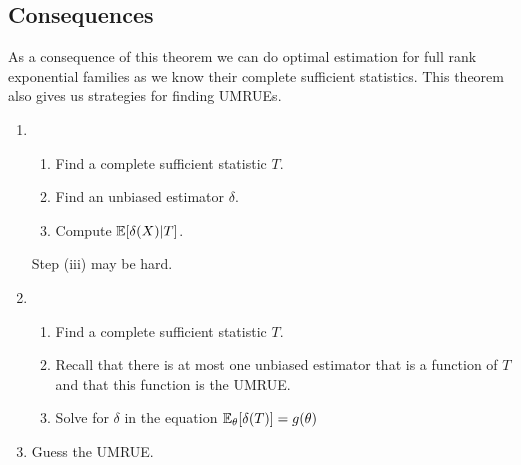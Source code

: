 \subsection{Consequences}
As a consequence of this theorem we can do optimal estimation for full rank exponential families as we know their complete sufficient statistics. This theorem also gives us strategies for finding UMRUEs.
\begin{enumerate}
    \item 
    \begin{enumerate}
        \item Find a complete sufficient statistic $T$.
        \item Find an unbiased estimator $\delta$.
        \item Compute ${\mathbb{E}}[\delta(X)|T]$.
    \end{enumerate}
    Step (iii) may be hard.
    \item \begin{enumerate}
        \item Find a complete sufficient statistic $T$.
        \item Recall that there is at most one unbiased estimator that is a function of $T$ and that this function is the UMRUE.
        \item Solve for $\delta$ in the equation ${\mathbb{E}}_{\theta}[\delta(T)] = g({\theta})$
    \end{enumerate}
    \item Guess the UMRUE.
\end{enumerate}

